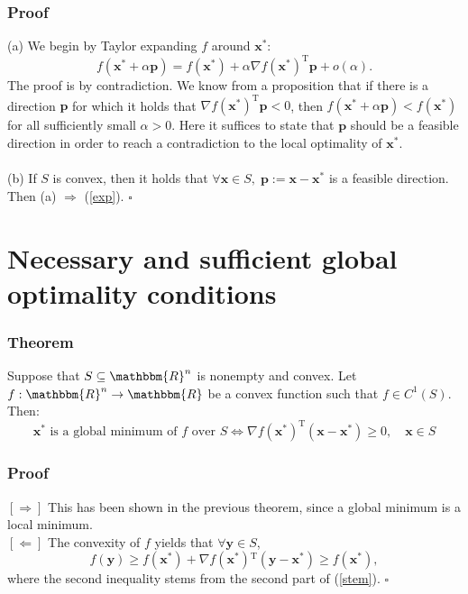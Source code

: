 \documentclass[12pt, a4paper]{article}
\begin{document}
\subsubsection*{Proof}
(a) We begin by Taylor expanding $f$ around $\bm{x}^*$:
\begin{equation*}
    f(\bm{x}^* + \alpha \bm{p}) = f(\bm{x}^*)+\alpha \nabla f(\bm{x}^*)^{\text{T}}\bm{p} + o(\alpha).
\end{equation*}
The proof is by contradiction. We know from a proposition that if there is a direction $\bm{p}$ for which it holds that $\nabla f(\bm{x}^*)^{\text{T}}\bm{p}<0$, then $f(\bm{x}^*+\alpha\bm{p})<f(\bm{x}^*)$ for all sufficiently small $\alpha>0$. Here it suffices to state that $\bm{p}$ should be a feasible direction in order to reach a contradiction to the local optimality of $\bm{x}^*$.
\\\\
(b) If $S$ is convex, then it holds that $\forall \bm{x}\in S,\; \bm{p}:= \bm{x}-\bm{x}^*$ is a feasible direction. Then (a) $\Rightarrow$ (\ref{exp}). $\square$

\section{Necessary and sufficient global optimality conditions}
\subsubsection*{Theorem}
Suppose that $S\subseteq \mathbbm{R}^n$ is nonempty and convex. Let $f : \mathbbm{R}^n \rightarrow \mathbbm{R}$ be a convex function such that $f\in C^1(S)$. Then:
\begin{equation}
\label{stem}
    \bm{x}^* \text{ is a global minimum of } f \text{ over } S \Leftrightarrow \nabla f(\bm{x}^*)^{\text{T}}(\bm{x}-\bm{x}^*)\geq 0, \quad \bm{x}\in S
\end{equation}

\subsubsection*{Proof}
$[\Rightarrow]$ This has been shown in the previous theorem, since a global minimum is a local minimum.
\\
$[\Leftarrow]$ The convexity of $f$ yields that $\forall \bm{y}\in S$,
\begin{equation*}
    f(\bm{y}) \geq f(\bm{x}^*) + \nabla f(\bm{x}^*){^\text{T}}(\bm{y}-\bm{x}^*)\geq f(\bm{x}^*),
\end{equation*}
where the second inequality stems from the second part of (\ref{stem}). $\square$
\end{document}
